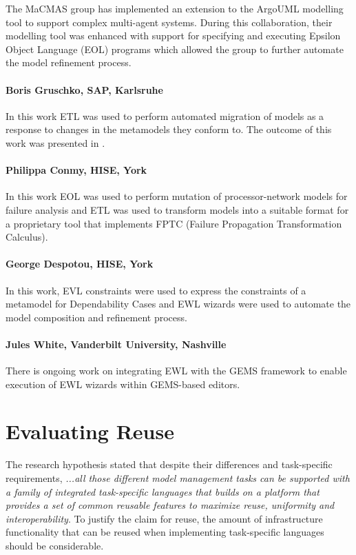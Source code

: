 The MaCMAS group has implemented an extension to the ArgoUML modelling tool to support complex multi-agent systems. During this collaboration, their modelling tool was enhanced with support for specifying and executing Epsilon Object Language (EOL) programs which allowed the group to further automate the model refinement process.

\paragraph{Boris Gruschko, SAP, Karlsruhe}

In this work ETL was used to perform automated migration of models as a response to changes in the metamodels they conform to. The outcome of this work was presented in \cite{Gruschko2007}.

\paragraph{Philippa Conmy, HISE, York}

In this work EOL was used to perform mutation of processor-network models for failure analysis and ETL was used to transform models into a suitable format for a proprietary tool that implements FPTC (Failure Propagation Transformation Calculus).

\paragraph{George Despotou, HISE, York}

In this work, EVL constraints were used to express the constraints of a metamodel for Dependability Cases and EWL wizards were used to automate the model composition and refinement process.

\paragraph{Jules White, Vanderbilt University, Nashville}

There is ongoing work on integrating EWL with the GEMS \cite{GEMS} framework to enable execution of EWL wizards within GEMS-based editors.

\section{Evaluating Reuse}
\label{sec:Evaluation.Reuse}

The research hypothesis stated that despite their differences and task-specific requirements, \textit{...all those different model management tasks can be supported with a family of integrated task-specific languages that builds on a platform that provides a set of common reusable
features to maximize reuse, uniformity and interoperability}. To justify the claim for reuse, the amount of infrastructure functionality that can be reused when implementing task-specific languages should be considerable.

